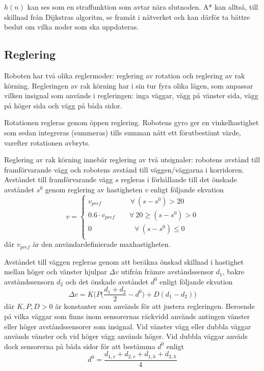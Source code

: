 \documentclass[11pt]{article}
\begin{document}
\begin{flushleft}
$h(n)$ kan ses som en straffunktion som avtar nära slutnoden. A* kan alltså, till skillnad från Dijkstras algoritm, se framåt i nätverket och kan därför ta bättre beslut om vilka noder som ska uppdateras.

\subsection{Reglering}\label{subsection:reglering}
Roboten har två olika reglermoder: reglering av rotation och reglering av rak körning. Regleringen av rak körning har i sin tur fyra olika lägen, som anpassar vilken insignal som används i regleringen: inga väggar, vägg på vänster sida, vägg på höger sida och vägg på båda sidor.

Rotationen regleras genom öppen reglering. Robotens gyro ger en vinkelhastighet som sedan integreras (summeras) tills summan nått ett förutbestämt värde, varefter rotationen avbryts.

Reglering av rak körning innebär reglering av två utsignaler: robotens avstånd till framförvarande vägg och robotens avstånd till väggen/väggarna i korridoren. Avståndet till framförvarande vägg $s$ regleras i förhållande till det önskade avståndet $s^0$ genom reglering av hastigheten $v$ enligt följande ekvation
\begin{equation*}
	v = 
	\begin{cases}
		v_{pref} \qquad\qquad \forall \ (s - s^0) > 20 \\
		0.6 \cdot v_{pref} \qquad \forall \ 20 \geq (s - s^0) > 0 \\
		0 \qquad\qquad\qquad \forall \ (s - s^0)\leq 0 \\
	\end{cases}
\end{equation*}
där $v_{pref}$ är den användardefinierade maxhastigheten.

Avståndet till väggen regleras genom att beräkna önskad skillnad i hastighet mellan höger och vänster hjulpar $\Delta v$ utifrån främre avståndssensor $d_1$, bakre avståndssensorn $d_2$ och det önskade avståndet $d^0$ enligt följande ekvation
\begin{equation*}
	\Delta v = K \Bigg( P \Big( \frac {d_1 + d_2} {2} - d^0 \Big) + D (d_1 - d_2) \Bigg)
\end{equation*}
där $K, P, D > 0$ är konstanter som används för att justera regleringen. Beroende på vilka väggar som finns inom sensorernas räckvidd används antingen vänster eller höger avståndssensorer som insignal. Vid vänster vägg eller dubbla väggar används vänster och vid höger vägg används höger. Vid dubbla väggar anväds dock sensorerna på båda sidor för att bestämma  $d^0$ enligt
\begin{equation*}
	d^0 = \frac {d_{1,v} + d_{2,v} + d_{1,h} + d_{2,h}} {4}
\end{equation*}


\end{flushleft}
\end{document}
